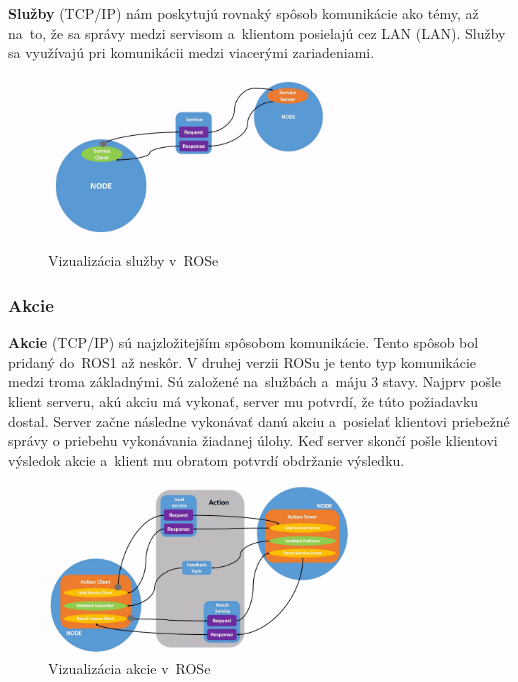 \textbf {Služby} (TCP/IP) nám poskytujú rovnaký spôsob komunikácie ako témy, až na~to, že sa správy medzi servisom a~klientom posielajú
cez LAN (\acrlong{LAN}). Služby sa využívajú pri komunikácii medzi viacerými zariadeniami.

\begin{figure}[h]
	\centering
	\includegraphics[width=8cm]{img/serviceExplanation.png}
	\caption{Vizualizácia služby v~ROSe~\cite{RosDoc}}
	\label{fig:service}
\end{figure}

\subsubsection{Akcie}

\label{s_action}
\textbf {Akcie} (TCP/IP) sú najzložitejším spôsobom komunikácie. Tento spôsob bol pridaný do~ROS1 až neskôr. V druhej verzii ROSu je tento
typ komunikácie medzi troma základnými. Sú založené na~službách a~máju 3 stavy. Najprv pošle klient serveru, akú akciu má vykonať, server mu potvrdí,
že túto požiadavku dostal. Server začne následne vykonávať danú akciu a~posielať klientovi priebežné správy o priebehu vykonávania žiadanej úlohy.
Keď server skončí pošle klientovi výsledok akcie a~klient mu obratom potvrdí obdržanie výsledku.

\begin{figure}[h]
	\centering
	\includegraphics[width=8cm]{img/actionExplanation.png}
	\caption{Vizualizácia akcie v~ROSe~\cite{RosDoc}}
	\label{fig:action}
\end{figure}

